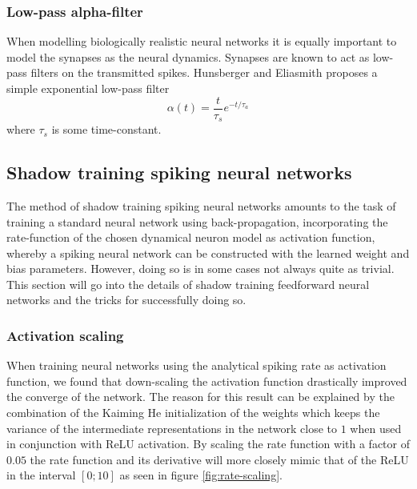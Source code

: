 \documentclass[a4paper,11pt]{article} %
\begin{document}
\subsubsection{Low-pass alpha-filter}
When modelling biologically realistic neural networks it is equally important to model the synapses as the neural dynamics. Synapses are known to act as low-pass filters on the transmitted spikes. Hunsberger and Eliasmith \cite{hunsberger2015spiking} proposes a simple exponential low-pass filter
\begin{equation} \label{eq:alpha-filter}
  \alpha(t) = \frac{t}{\tau_{s}} e^{-t / \tau_{a}}
\end{equation}
where $\tau_s$ is some time-constant. 



\subsection{Shadow training spiking neural networks}
The method of shadow training spiking neural networks amounts to the task of training a standard neural network using back-propagation, incorporating the rate-function of the chosen dynamical neuron model as activation function, whereby a spiking neural network can be constructed with the learned weight and bias parameters. However, doing so is in some cases not always quite as trivial. This section will go into the details of shadow training feedforward neural networks and the tricks for successfully doing so. 

\subsubsection{Activation scaling} \label{sec:activation-scaling}
When training neural networks using the analytical spiking rate as activation function, we found that down-scaling the activation function drastically improved the converge of the network. The reason for this result can be explained by the combination of the Kaiming He initialization of the weights which keeps the variance of the intermediate representations in the network close to $1$ when used in conjunction with ReLU activation. By scaling the rate function with a factor of $0.05$ the rate function and its derivative will more closely mimic that of the ReLU in the interval $[0; 10]$ as seen in figure \ref{fig:rate-scaling}. 
\end{document}

